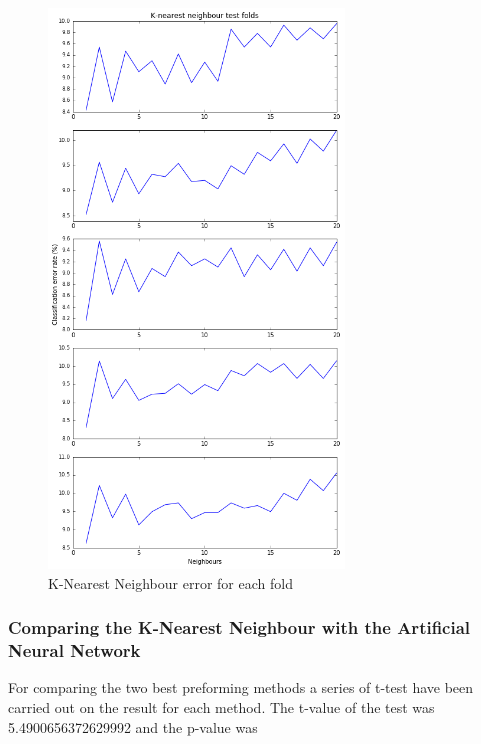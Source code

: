 \vspace{-5pt}
\begin{figure}[h]
	\centering
	\includegraphics[width=0.7\textwidth]{Fig/classification_KNN}
	\vspace{-5pt}
	\caption{K-Nearest Neighbour error for each fold}
	\label{fig:classification_KNN}
\end{figure}

\subsubsection{Comparing the K-Nearest Neighbour with the Artificial Neural Network}
For comparing the two best preforming methods a series of t-test have been carried out on the result for each method. The t-value of the test was 5.4900656372629992 and the p-value was 
